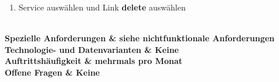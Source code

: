 \begin{longtabu}
\begin{enumerate}
\begin{enumerate}
            \begin{enumerate}
              \item Service auswählen und Link \textbf{delete} auswählen
            \end{enumerate}
        \end{enumerate}
      \end{enumerate}
      \\\hline
	\bfseries Spezielle Anforderungen & siehe nichtfunktionale Anforderungen  \\\hline 
	\bfseries Technologie- und Datenvarianten & Keine  \\\hline 
	\bfseries Auftrittshäufigkeit & mehrmals pro Monat  \\\hline 
	\bfseries Offene Fragen & Keine  \\\hline  
\end{longtabu}
